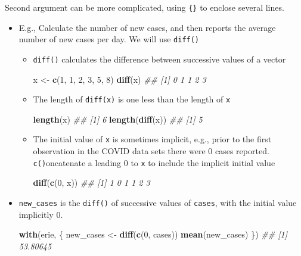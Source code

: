 \documentclass[]{book}
\newenvironment{Shaded}{\begin{snugshade}}{\end{snugshade}}
\newcommand{\CommentTok}[1]{\textcolor[rgb]{0.56,0.35,0.01}{\textit{#1}}}
\newcommand{\DecValTok}[1]{\textcolor[rgb]{0.00,0.00,0.81}{#1}}
\newcommand{\KeywordTok}[1]{\textcolor[rgb]{0.13,0.29,0.53}{\textbf{#1}}}
\newcommand{\NormalTok}[1]{#1}
\newcommand{\StringTok}[1]{\textcolor[rgb]{0.31,0.60,0.02}{#1}}
\begin{document}
Second argument can be more complicated, using \texttt{\{\}} to enclose several lines.

\begin{itemize}
\item
  E.g., Calculate the number of new cases, and then reports the average number of new cases per day. We will use \texttt{diff()}

  \begin{itemize}
  \item
    \texttt{diff()} calculates the difference between successive values of a vector

\begin{Shaded}
\begin{Highlighting}[]
\NormalTok{x <-}\StringTok{ }\KeywordTok{c}\NormalTok{(}\DecValTok{1}\NormalTok{, }\DecValTok{1}\NormalTok{, }\DecValTok{2}\NormalTok{, }\DecValTok{3}\NormalTok{, }\DecValTok{5}\NormalTok{, }\DecValTok{8}\NormalTok{)}
\KeywordTok{diff}\NormalTok{(x)}
\CommentTok{## [1] 0 1 1 2 3}
\end{Highlighting}
\end{Shaded}
  \item
    The length of \texttt{diff(x)} is one less than the length of \texttt{x}

\begin{Shaded}
\begin{Highlighting}[]
\KeywordTok{length}\NormalTok{(x)}
\CommentTok{## [1] 6}
\KeywordTok{length}\NormalTok{(}\KeywordTok{diff}\NormalTok{(x))}
\CommentTok{## [1] 5}
\end{Highlighting}
\end{Shaded}
  \item
    The initial value of \texttt{x} is sometimes implicit, e.g., prior to the first observation in the COVID data sets there were 0 cases reported. \texttt{c()}oncatenate a leading 0 to \texttt{x} to include the implicit initial value

\begin{Shaded}
\begin{Highlighting}[]
\KeywordTok{diff}\NormalTok{(}\KeywordTok{c}\NormalTok{(}\DecValTok{0}\NormalTok{, x))}
\CommentTok{## [1] 1 0 1 1 2 3}
\end{Highlighting}
\end{Shaded}
  \end{itemize}
\item
  \texttt{new\_cases} is the \texttt{diff()} of successive values of \texttt{cases}, with the initial value implicitly 0.

\begin{Shaded}
\begin{Highlighting}[]
\KeywordTok{with}\NormalTok{(erie, \{}
\NormalTok{    new_cases <-}\StringTok{ }\KeywordTok{diff}\NormalTok{(}\KeywordTok{c}\NormalTok{(}\DecValTok{0}\NormalTok{, cases))}
    \KeywordTok{mean}\NormalTok{(new_cases)}
\NormalTok{\})}
\CommentTok{## [1] 53.80645}
\end{Highlighting}
\end{Shaded}
\end{itemize}
\end{document}
